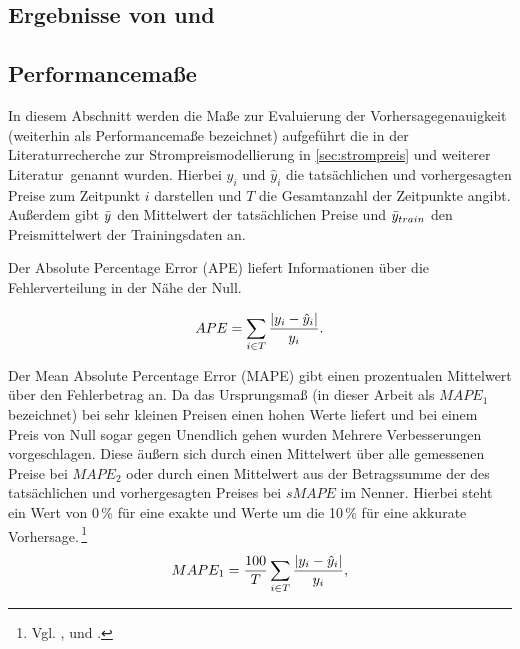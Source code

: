 \subsection{Ergebnisse von \citet{Aggarwal2009} und \citet{Panapakidis2016}}\label{sec:andere_ergebnisse}



\subsection{Performancemaße}\label{sec:perfmas}
In diesem Abschnitt werden die Maße zur Evaluierung der Vorhersagegenauigkeit (weiterhin als Performancemaße bezeichnet) aufgeführt die in der Literaturrecherche zur Strompreismodellierung in \autoref{sec:strompreis} und weiterer Literatur\, genannt wurden. Hierbei $y_i$ und $\hat{y}_i$ die tatsächlichen und vorhergesagten Preise zum Zeitpunkt $i$ darstellen und $T$ die Gesamtanzahl der Zeitpunkte angibt. Außerdem gibt $\bar{y}$ den Mittelwert der tatsächlichen Preise und $\bar{y}_{train}$ den Preismittelwert der Trainingsdaten an.

Der Absolute Percentage Error (APE) liefert Informationen über die Fehlerverteilung in der Nähe der Null.\,

\begin{equation}
APE= \sum\limits_{i \in T} \frac{\abs{y_i-\hat{y}_i}}{y_i}.
\label{gl:APE}
\end{equation}


Der Mean Absolute Percentage Error (MAPE) gibt einen prozentualen Mittelwert über den Fehlerbetrag an. Da das Ursprungsmaß (in dieser Arbeit als $MAPE_1$ bezeichnet) bei sehr kleinen Preisen einen hohen Werte liefert und bei einem Preis von Null sogar gegen Unendlich gehen wurden Mehrere Verbesserungen vorgeschlagen. Diese äußern sich durch einen Mittelwert über alle gemessenen Preise bei $MAPE_2$ oder durch einen Mittelwert aus der Betragssumme der des tatsächlichen und vorhergesagten Preises bei $sMAPE$ im Nenner. Hierbei steht ein Wert von 0\,\% für eine exakte und Werte um die 10\,\% für eine akkurate Vorhersage.\,\footnote{Vgl. \citet[17]{Bobinaite2016}, \citet[2105]{Amjady2009} und \citet[894]{Lago2018}.}   
\begin{equation}
MAPE_1= \frac{100}{T} \sum\limits_{i \in T} \frac{\abs{y_i-\hat{y}_i}}{y_i},
\label{gl:MAPE_1}
\end{equation}

